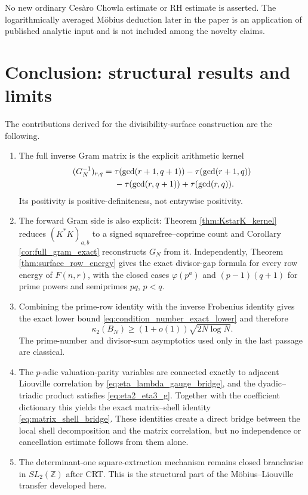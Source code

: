 \documentclass[11pt]{amsart}
\numberwithin{equation}{section}
\theoremstyle{plain}
\theoremstyle{definition}
\theoremstyle{remark}
\newcommand{\Z}{\mathbb Z}
\begin{document}
No new ordinary Cesàro Chowla estimate or RH estimate is asserted.  The logarithmically averaged Möbius deduction later in the paper is an application of published analytic input and is not included among the novelty claims.

\section{Conclusion: structural results and limits}
\label{sec:conclusion}

The contributions derived for the divisibility-surface construction are the following.
\begin{enumerate}[label=(\roman*)]
\item The full inverse Gram matrix is the explicit arithmetic kernel
\begin{align}
(G_N^{-1})_{r,q}
={}&\tau(\gcd(r+1,q+1))-\tau(\gcd(r+1,q))\notag\\
&-\tau(\gcd(r,q+1))+\tau(\gcd(r,q)).
\label{eq:conclusion_gram_gcd}
\end{align}
Its positivity is positive-definiteness, not entrywise positivity.

\item The forward Gram side is also explicit: Theorem \ref{thm:KstarK_kernel} reduces $(K^*K)_{a,b}$ to a signed squarefree--coprime count and Corollary \ref{cor:full_gram_exact} reconstructs $G_N$ from it.  Independently, Theorem \ref{thm:surface_row_energy} gives the exact divisor-gap formula for every row energy of $F(n,r)$, with the closed cases $\varphi(p^a)$ and $(p-1)(q+1)$ for prime powers and semiprimes $pq$, $p<q$.

\item Combining the prime-row identity with the inverse Frobenius identity gives the exact lower bound \eqref{eq:condition_number_exact_lower} and therefore
\begin{equation}
\kappa_2(B_N)\ge(1+o(1))\sqrt{2N\log N}.
\label{eq:conclusion_condition_number}
\end{equation}
The prime-number and divisor-sum asymptotics used only in the last passage are classical.

\item The $p$-adic valuation-parity variables are connected exactly to adjacent Liouville correlation by \eqref{eq:eta_lambda_gauge_bridge}, and the dyadic--triadic product satisfies \eqref{eq:eta2_eta3_g}.  Together with the coefficient dictionary this yields the exact matrix--shell identity \eqref{eq:matrix_shell_bridge}.  These identities create a direct bridge between the local shell decomposition and the matrix correlation, but no independence or cancellation estimate follows from them alone.

\item The determinant-one square-extraction mechanism remains closed branchwise in $SL_2(\Z)$ after CRT.  This is the structural part of the Möbius--Liouville transfer developed here.

\end{enumerate}
\end{document}
